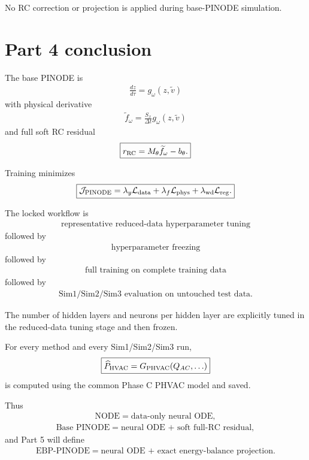 \documentclass[11pt]{article}
\begin{document}
No RC correction or projection is applied during base-PINODE simulation.

\section*{Part 4 conclusion}

The base PINODE is
\begin{align}
\boxed{
\frac{dz}{d\tau}=g_\omega(z,\widetilde v)
}
\end{align}
with physical derivative
\begin{align}
\boxed{
\widetilde f_\omega
=
\frac{S_x}{\Delta t}g_\omega(z,\widetilde v)
}
\end{align}
and full soft RC residual
\begin{align}
\boxed{
r_{\rm RC}
=
M_\theta\widetilde f_\omega-b_\theta.
}
\end{align}

Training minimizes
\begin{align}
\boxed{
\mathcal J_{\rm PINODE}
=
\lambda_y\mathcal L_{\rm data}
+
\lambda_f\mathcal L_{\rm phys}
+
\lambda_{\rm wd}\mathcal L_{\rm reg}.
}
\end{align}

The locked workflow is
\begin{align}
\boxed{\text{representative reduced-data hyperparameter tuning}}
\end{align}
followed by
\begin{align}
\boxed{\text{hyperparameter freezing}}
\end{align}
followed by
\begin{align}
\boxed{\text{full training on complete training data}}
\end{align}
followed by
\begin{align}
\boxed{\text{Sim1/Sim2/Sim3 evaluation on untouched test data}.}
\end{align}

The number of hidden layers and neurons per hidden layer are explicitly tuned in the reduced-data tuning stage and then frozen.

For every method and every Sim1/Sim2/Sim3 run,
\begin{align}
\boxed{
\widehat P_{\rm HVAC}
=
G_{\rm PHVAC}(Q_{AC},\ldots)
}
\end{align}
is computed using the common Phase C PHVAC model and saved.

Thus
\begin{align}
\boxed{\text{NODE}=\text{data-only neural ODE},}
\end{align}
\begin{align}
\boxed{\text{Base PINODE}=\text{neural ODE + soft full-RC residual},}
\end{align}
and Part 5 will define
\begin{align}
\boxed{\text{EBP-PINODE}=\text{neural ODE + exact energy-balance projection}.}
\end{align}
\end{document}
